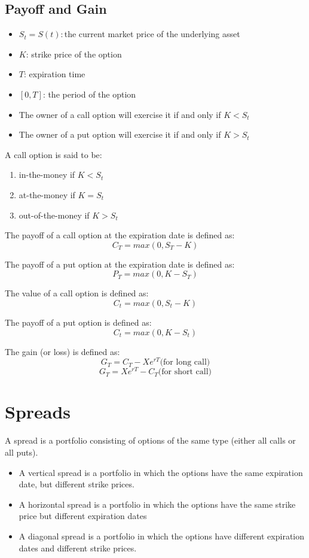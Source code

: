 \documentclass{report}
\begin{document}
\subsection{Payoff and Gain}
\begin{itemize}
    \item $S_t = S(t): $the current market price of the underlying asset
    \item $K$: strike price of the option
    \item $T$: expiration time
    \item $[0,T]$: the period of the option
\end{itemize}


\begin{itemize}
    \item The owner of a call option will exercise it if and only if $K < S_t$
    \item The owner of a put option will exercise it if and only if $K > S_t$
\end{itemize}


A call option is said to be:
\begin{enumerate}
    \item in-the-money if $K < S_t$
    \item at-the-money if $K = S_t$
    \item out-of-the-money if $K > S_t$
\end{enumerate}


The payoff of a call option at the expiration date is defined as:
\[
C_T = max(0, S_T-K)
\]

The payoff of a put option at the expiration date is defined as:
\[
P_T = max(0, K-S_T)
\]


The value of a call option is defined as:
\[
C_t = max(0, S_t-K)
\]

The payoff of a put option is defined as:
\[
C_t = max(0, K-S_t)
\]

The gain (or loss) is defined as:
\[G_T = C_T - Xe^{rT}      \text{(for long call)}\]
\[G_T = Xe^{rT} - C_T      \text{(for short call)}\]


\section{Spreads}
A spread is a portfolio consisting of options of the same type (either all calls or all puts).
\begin{itemize}
    \item A vertical spread is a portfolio in which the options have the same expiration date, but different strike prices.
    \item A horizontal spread is a portfolio in which the options have the same strike price but different expiration dates
    \item A diagonal spread is a portfolio in which the options have different expiration dates and different strike prices.
\end{itemize}
\end{document}
